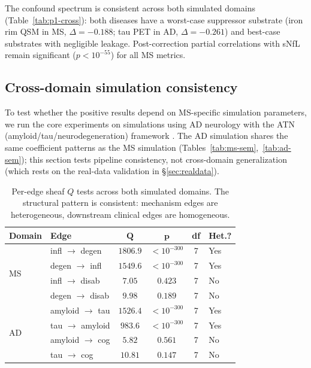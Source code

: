 \documentclass[11pt]{article}
\begin{document}
The confound spectrum is consistent across both simulated domains (Table~\ref{tab:p1-cross}): both diseases have a worst-case suppressor substrate (iron rim QSM in MS, $\Delta = -0.188$; tau PET in AD, $\Delta = -0.261$) and best-case substrates with negligible leakage.
Post-correction partial correlations with sNfL remain significant ($p < 10^{-55}$) for all MS metrics.

\subsection{Cross-domain simulation consistency}
\label{sec:ad}

To test whether the positive results depend on MS-specific simulation parameters, we run the core experiments on simulations using AD neurology with the ATN (amyloid/tau/neurodegeneration) framework \citep{jack2018niaaa}. The AD simulation shares the same coefficient patterns as the MS simulation (Tables~\ref{tab:ms-sem},~\ref{tab:ad-sem}); this section tests pipeline consistency, not cross-domain generalization (which rests on the real-data validation in \S\ref{sec:realdata}).

\begin{table}[t]
\centering
\caption{Per-edge sheaf $Q$ tests across both simulated domains. The structural pattern is consistent: mechanism edges are heterogeneous, downstream clinical edges are homogeneous.}
\label{tab:dag-cross}
\small
\begin{tabular}{@{}llcccl@{}}
\toprule
\textbf{Domain} & \textbf{Edge} & $\boldsymbol{Q}$ & $\boldsymbol{p}$ & \textbf{df} & \textbf{Het.?} \\
\midrule
\multirow{4}{*}{MS} & infl $\to$ degen & $1806.9$ & $< 10^{-300}$ & 7 & Yes \\
& degen $\to$ infl & $1549.6$ & $< 10^{-300}$ & 7 & Yes \\
& infl $\to$ disab & $7.05$ & $0.423$ & 7 & No \\
& degen $\to$ disab & $9.98$ & $0.189$ & 7 & No \\
\midrule
\multirow{4}{*}{AD} & amyloid $\to$ tau & $1526.4$ & $< 10^{-300}$ & 7 & Yes \\
& tau $\to$ amyloid & $983.6$ & $< 10^{-300}$ & 7 & Yes \\
& amyloid $\to$ cog & $5.82$ & $0.561$ & 7 & No \\
& tau $\to$ cog & $10.81$ & $0.147$ & 7 & No \\
\bottomrule
\end{tabular}
\end{table}
\end{document}

